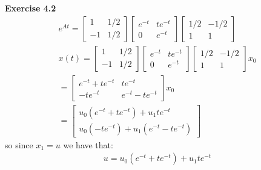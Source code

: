 \documentclass[12pt]{article}
\newenvironment{exercise}[1]{\vspace{.1in}\noindent\textbf{Exercise #1 \hspace{.05em}}}{}
\theoremstyle{definition}
\theoremstyle{remark}
\begin{document}
\begin{exercise}{4.2}
	\begin{align}
		e^{At}=
		\begin{bmatrix}
			1  & 1/2 \\
			-1 & 1/2
		\end{bmatrix} %
		\begin{bmatrix}
			e^{-t} & te^{-t} \\
			0      & e^{-t}
		\end{bmatrix}\begin{bmatrix}
			             1/2 & -1/2 \\
			             1   & 1
		             \end{bmatrix}     \\
		x(t)=
		\begin{bmatrix}
			1  & 1/2 \\
			-1 & 1/2
		\end{bmatrix} %
		\begin{bmatrix}
			e^{-t} & te^{-t} \\
			0      & e^{-t}
		\end{bmatrix}\begin{bmatrix}
			             1/2 & -1/2 \\
			             1   & 1
		             \end{bmatrix}x_0   \\
		=  %
		\begin{bmatrix}
			e^{-t}+te^{-t} & te^{-t}        \\
			-te^{-t}       & e^{-t}-te^{-t}
		\end{bmatrix}x_0 \\
		=%
		\begin{bmatrix}
			u_0(e^{-t}+te^{-t})+u_1te^{-t} \\
			u_0(-te^{-t})+u_1(e^{-t}-te^{-t})
		\end{bmatrix}
	\end{align}
	so since $x_1=u$ we have that:
	\begin{align}
		u=u_0(e^{-t}+te^{-t})+u_1te^{-t}
	\end{align}
\end{exercise}
\end{document}
